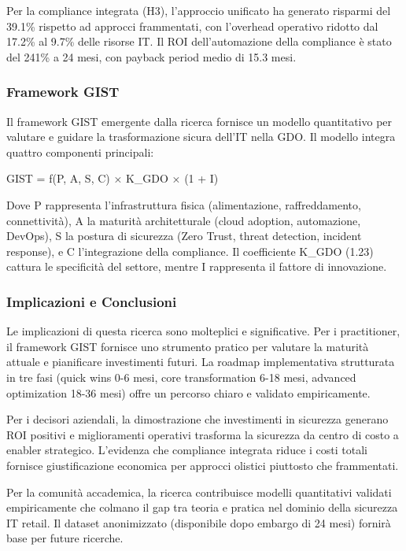 \documentclass[12pt,a4paper,oneside]{book}
\begin{document}
Per la compliance integrata (H3), l'approccio unificato ha generato
risparmi del 39.1\% rispetto ad approcci frammentati, con l'overhead
operativo ridotto dal 17.2\% al 9.7\% delle risorse IT. Il ROI
dell'automazione della compliance è stato del 241\% a 24 mesi, con
payback period medio di 15.3 mesi.

\subsubsection{Framework GIST}\label{framework-gist}

Il framework GIST emergente dalla ricerca fornisce un modello
quantitativo per valutare e guidare la trasformazione sicura dell'IT
nella GDO. Il modello integra quattro componenti principali:

GIST = f(P, A, S, C) × K\_GDO × (1 + I)

Dove P rappresenta l'infrastruttura fisica (alimentazione,
raffreddamento, connettività), A la maturità architetturale (cloud
adoption, automazione, DevOps), S la postura di sicurezza (Zero Trust,
threat detection, incident response), e C l'integrazione della
compliance. Il coefficiente K\_GDO (1.23) cattura le specificità del
settore, mentre I rappresenta il fattore di innovazione.

\subsubsection{Implicazioni e
Conclusioni}\label{implicazioni-e-conclusioni}

Le implicazioni di questa ricerca sono molteplici e significative. Per i
practitioner, il framework GIST fornisce uno strumento pratico per
valutare la maturità attuale e pianificare investimenti futuri. La
roadmap implementativa strutturata in tre fasi (quick wins 0-6 mesi,
core transformation 6-18 mesi, advanced optimization 18-36 mesi) offre
un percorso chiaro e validato empiricamente.

Per i decisori aziendali, la dimostrazione che investimenti in sicurezza
generano ROI positivi e miglioramenti operativi trasforma la sicurezza
da centro di costo a enabler strategico. L'evidenza che compliance
integrata riduce i costi totali fornisce giustificazione economica per
approcci olistici piuttosto che frammentati.

Per la comunità accademica, la ricerca contribuisce modelli quantitativi
validati empiricamente che colmano il gap tra teoria e pratica nel
dominio della sicurezza IT retail. Il dataset anonimizzato (disponibile
dopo embargo di 24 mesi) fornirà base per future ricerche.
\end{document}
